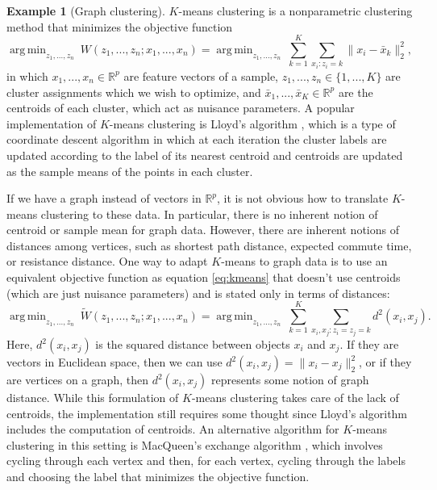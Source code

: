 \documentclass[
  12pt,
]{article}
\theoremstyle{definition}
\theoremstyle{definition}
\newtheorem{example}{Example}[section]
\theoremstyle{definition}
\theoremstyle{definition}
\theoremstyle{remark}
\begin{document}
\begin{example}[Graph clustering]
$K$-means clustering \citep{MacQueen1967} is a nonparametric clustering method that minimizes the objective function
\begin{equation}
\label{eq:kmeans}
\mathop{\mathrm{arg\,min}}_{z_1, ..., z_n} ~ W(z_1, ..., z_n; x_1, ..., x_n) = 
\mathop{\mathrm{arg\,min}}_{z_1, ..., z_n} ~ \sum_{k = 1}^K \sum_{x_i : z_i = k} \|x_i - \bar{x}_k\|_2^2,
\end{equation}
in which $x_1, ..., x_n \in \mathbb{R}^p$ are feature vectors of a sample, $z_1, ..., z_n \in \{1, ..., K\}$ are cluster assignments which we wish to optimize, and $\bar{x}_1, ..., \bar{x}_K \in \mathbb{R}^p$ are the centroids of each cluster, which act as nuisance parameters. 
A popular implementation of $K$-means clustering is Lloyd's algorithm \citep{1056489}, which is a type of coordinate descent algorithm in which at each iteration the cluster labels are updated according to the label of its nearest centroid and centroids are updated as the sample means of the points in each cluster. 

If we have a graph instead of vectors in $\mathbb{R}^p$, it is not obvious how to translate $K$-means clustering to these data. 
In particular, there is no inherent notion of centroid or sample mean for graph data. 
However, there are inherent notions of distances among vertices, such as shortest path distance, expected commute time, or resistance distance. 
One way to adapt $K$-means to graph data is to use an equivalent objective function as equation \eqref{eq:kmeans} that doesn't use centroids (which are just nuisance parameters) and is stated only in terms of distances:  
$$
\mathop{\mathrm{arg\,min}}_{z_1, ..., z_n} ~ \tilde{W}(z_1, ..., z_n; x_1, ..., x_n) =
\mathop{\mathrm{arg\,min}}_{z_1, ..., z_n} ~ \sum_{k=1}^K \sum_{x_i, x_j : z_i = z_j = k}  d^2(x_i, x_j).
$$
Here, $d^2(x_i, x_j)$ is the squared distance between objects $x_i$ and $x_j$. 
If they are vectors in Euclidean space, then we can use $d^2(x_i, x_j) = \|x_i - x_j\|_2^2$, 
or if they are vertices on a graph, then $d^2(x_i, x_j)$ represents some notion of graph distance. 
While this formulation of $K$-means clustering takes care of the lack of centroids, the implementation still requires some thought since Lloyd's algorithm includes the computation of centroids. 
An alternative algorithm for $K$-means clustering in this setting is MacQueen's exchange algorithm \citep{MacQueen1967}, which involves cycling through each vertex and then, for each vertex, cycling through the labels and choosing the label that minimizes the objective function. 


\end{example}
\end{document}
